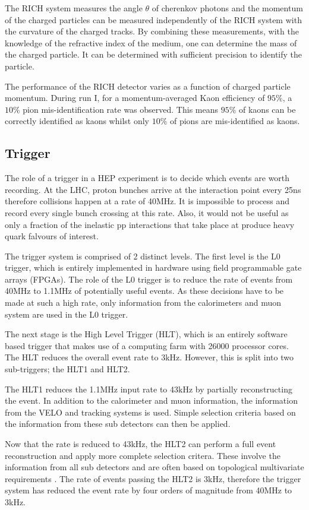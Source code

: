 The RICH system measures the angle $\theta$ of cherenkov photons and the momentum of the charged particles can be measured independently of the RICH system with the curvature of the charged tracks.  By combining these measurements, with the knowledge of the refractive index of the medium, one can determine the mass of the charged particle.  It can be determined with sufficient precision to identify the particle.

The performance of the RICH detector varies as a function of charged particle momentum.  During run I, for a momentum-averaged Kaon efficiency of $95\%$, a $10\%$ pion mis-identification rate was observed.  This means $95\%$ of kaons can be correctly identified as kaons whilst only $10\%$ of pions are mis-identified as kaons\cite{Aaij:1978280}.

\subsection{Trigger}
\label{sec:Trigger}
The role of a trigger in a HEP experiment is to decide which events are worth recording.  At the LHC, proton bunches arrive at the interaction point every 25ns therefore collisions happen at a rate of 40MHz.  It is impossible to process and record every single bunch crossing at this rate.  Also, it would not be useful as only a fraction of the inelastic pp interactions that take place at \lhcb produce heavy quark falvours of interest.

The \lhcb trigger system is comprised of 2 distinct levels.  The first level is the L0 trigger, which is entirely implemented in hardware using field programmable gate arrays (FPGAs).  The role of the L0 trigger is to reduce the rate of events from 40MHz to 1.1MHz of potentially useful events.  As these decisions have to be made at such a high rate, only information from the calorimeters and muon system are used in the L0 trigger.

The next stage is the High Level Trigger (HLT), which is an entirely software based trigger that makes use of a computing farm with 26000 processor cores.  The HLT reduces the overall event rate to 3kHz.  However, this is split into two sub-triggers; the HLT1 and HLT2.

The HLT1 reduces the 1.1MHz input rate to 43kHz by partially reconstructing the event.  In addition to the calorimeter and muon information, the information from the VELO and tracking systems is used.  Simple selection criteria based on the information from these sub detectors can then be applied.

Now that the rate is reduced to 43kHz, the HLT2 can perform a full event reconstruction and apply more complete selection critera.  These involve the information from all sub detectors and are often based on topological multivariate requirements \cite{BBDT}.  The rate of events passing the HLT2 is 3kHz, therefore the \lhcb trigger system has reduced the event rate by four orders of magnitude from 40MHz to 3kHz.


\clearpage
